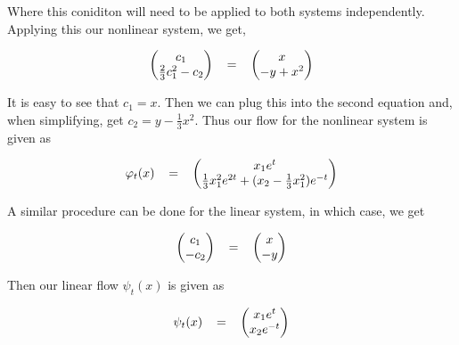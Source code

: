 \begin{solution}
    Where this coniditon will need to be applied to both systems independently. Applying this our nonlinear system, we get,

    \begin{align}
        \begin{pmatrix}c_1\\ \frac{2}{3}c_1^2 - c_2\end{pmatrix} 
        \hspace{3mm} = \hspace{3mm}
        \begin{pmatrix}x \\ -y + x^2\end{pmatrix} \nonumber
    \end{align}

    It is easy to see that $c_1 = x$. Then we can plug this into the second equation and, when simplifying, get $c_2 = y - \frac{1}{3}x^2$. Thus our flow for the nonlinear system is given as 

    \begin{align}
        \varphi_t(x)
        \hspace{3mm} = \hspace{3mm}
        \begin{pmatrix}
            x_1 e^t\\
            \frac{1}{3} x_1^2 e^{2 t} + (x_2 - \frac{1}{3}x_1^2) e^{-t}
        \end{pmatrix}\label{p4: nonlinear flow}
    \end{align}

    A similar procedure can be done for the linear system, in which case, we get

    \begin{align}
        \begin{pmatrix}c_1\\ - c_2\end{pmatrix} 
        \hspace{3mm} = \hspace{3mm}
        \begin{pmatrix}x \\ -y\end{pmatrix} \nonumber
    \end{align}

    Then our linear flow $\psi_t(x)$ is given as 

    \begin{align}
        \psi_t(x)
        \hspace{3mm} = \hspace{3mm}
        \begin{pmatrix}
            x_1 e^t\\
            x_2e^{-t}
        \end{pmatrix}\label{p4: linear flow}
    \end{align}


\end{solution}
